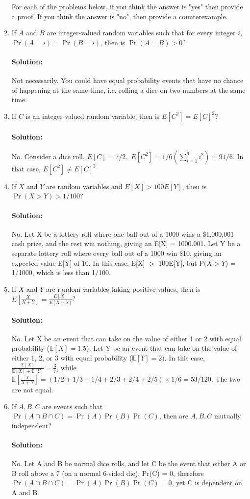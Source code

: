 \documentclass[11pt, notitlepage]{article}
\newcommand{\E}{\mathbb{E}}
\newenvironment{solution}{\paragraph{Solution:}}{\hfill \vspace{10mm}}
\begin{document}
\begin{enumerate}[label=\alph*.)]
	For each of the problems below, if you think the answer is "yes" then provide a proof. If you think the answer is "no", then provide a counterexample.

	\item If $A$ and $B$ are integer-valued random variables such that for every integer $i$, $\Pr(A = i) = \Pr(B = i)$, then is $\Pr(A = B) > 0$?
	\begin{solution}
		Not necessarily. You could have equal probability events that have no chance of happening at the same time, i.e. rolling a dice on two numbers at the same time.
	\end{solution}
	\newpage
	\item If $C$ is an integer-valued random variable, then is $E[C^2] = E[C]^2$?
	\begin{solution}
		No. Consider a dice roll, $E[C]=7/2,$ $E[C^2]=1/6(\sum_{i=1}^{6}i^2)=91/6$. In that case, $E[C^2] \not = E[C]^2$
	\end{solution}
	\item If $X$ and $Y$ are random variables and $E[X] > 100 E[Y]$, then is $\Pr(X > Y) > 1 / 100$?
	\begin{solution}
		No. Let X be a lottery roll where one ball out of a 1000 wins a \$1,000,001 cash prize, and the rest win nothing, giving an E[X] = 1000.001. Let Y be a separate lottery roll where every ball out of a 1000 win  \$10, giving an expected value E[Y] of 10. In this case, E[X] $>$ 100E[Y], but P($X > Y$) = 1/1000, which is less than 1/100.
	\end{solution}
	\item If $X$ and $Y$ are random variables taking positive values, then is $E[\frac{X}{X+Y}] = \frac{E[X]}{E[X+Y]}$?
	\begin{solution}
		No. Let X be an event that can take on the value of either 1 or 2 with equal probability ($\E[X]=1.5)$. Let Y be an event that can take on the value of either 1, 2, or 3 with equal probability ($\E[Y]=2)$. In this case, $\frac{\E[X]}{\E[X]+\E[Y]}=\frac{3}{7}$, while $\E[\frac{X}{X+Y}]=(1/2+1/3+1/4+2/3+2/4+2/5)\times 1/6=53/120$. The two are not equal.
	\end{solution}
	\item If $A, B, C$ are events such that $\Pr(A \cap B \cap C) = \Pr(A) \Pr(B) \Pr(C)$, then are $A, B, C$ mutually independent?
	\begin{solution}
		No. Let A and B be normal dice rolls, and let C be the event that either A or B roll above a 7 (on a normal 6-sided die). Pr(C) = 0, therefore $\Pr(A \cap B \cap C) = \Pr(A) \Pr(B) \Pr(C) = 0$, yet C is dependent on A and B.

\end{solution}
\end{enumerate}
\end{document}

